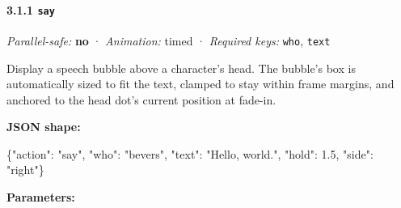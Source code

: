 \documentclass[
  12pt,
  letterpaper,
]{book}
\newenvironment{Shaded}{}{}
\newcommand{\DataTypeTok}[1]{\textcolor[rgb]{0.56,0.13,0.00}{#1}}
\newcommand{\FloatTok}[1]{\textcolor[rgb]{0.25,0.63,0.44}{#1}}
\newcommand{\FunctionTok}[1]{\textcolor[rgb]{0.02,0.16,0.49}{#1}}
\newcommand{\StringTok}[1]{\textcolor[rgb]{0.25,0.44,0.63}{#1}}
\begin{document}
\paragraph{\texorpdfstring{3.1.1 \texttt{say}}{3.1.1 say}}\label{say}

\emph{Parallel-safe:} \textbf{no} · \emph{Animation:} timed ·
\emph{Required keys:} \texttt{who}, \texttt{text}

Display a speech bubble above a character's head. The bubble's box is
automatically sized to fit the text, clamped to stay within frame
margins, and anchored to the head dot's current position at fade-in.

\textbf{JSON shape:}

\begin{Shaded}
\begin{Highlighting}[]
\FunctionTok{\{}\DataTypeTok{"action"}\FunctionTok{:} \StringTok{"say"}\FunctionTok{,} \DataTypeTok{"who"}\FunctionTok{:} \StringTok{"bevers"}\FunctionTok{,} \DataTypeTok{"text"}\FunctionTok{:} \StringTok{"Hello, world."}\FunctionTok{,}
 \DataTypeTok{"hold"}\FunctionTok{:} \FloatTok{1.5}\FunctionTok{,} \DataTypeTok{"side"}\FunctionTok{:} \StringTok{"right"}\FunctionTok{\}}
\end{Highlighting}
\end{Shaded}

\textbf{Parameters:}
\end{document}
